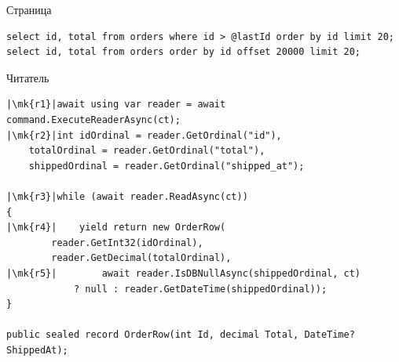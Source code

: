 \documentclass[aspectratio=169,10pt,t]{beamer}
\newcommand{\codesm}{\ttfamily\fontsize{7.6}{9.0}\selectfont}
\newcommand{\codexs}{\ttfamily\fontsize{7.0}{8.3}\selectfont}
\newcommand{\mk}[1]{\tikz[remember picture,overlay]\coordinate (#1) at (0,0.55ex);}
\begin{document}
\begin{frame}[fragile]{Страница}
  \slidetop

  \slidegap
\begin{lstlisting}[style=plain,basicstyle=\codesm]
select id, total from orders where id > @lastId order by id limit 20;
select id, total from orders order by id offset 20000 limit 20;
\end{lstlisting}

\end{frame}

\begin{frame}[fragile]{Читатель}
  \vspace{0.3em}
\begin{lstlisting}[style=csharp,basicstyle=\codexs,escapechar=|]
|\mk{r1}|await using var reader = await command.ExecuteReaderAsync(ct);
|\mk{r2}|int idOrdinal = reader.GetOrdinal("id"),
    totalOrdinal = reader.GetOrdinal("total"),
    shippedOrdinal = reader.GetOrdinal("shipped_at");

|\mk{r3}|while (await reader.ReadAsync(ct))
{
|\mk{r4}|    yield return new OrderRow(
        reader.GetInt32(idOrdinal),
        reader.GetDecimal(totalOrdinal),
|\mk{r5}|        await reader.IsDBNullAsync(shippedOrdinal, ct)
            ? null : reader.GetDateTime(shippedOrdinal));
}

public sealed record OrderRow(int Id, decimal Total, DateTime? ShippedAt);
\end{lstlisting}

\end{frame}
\end{document}
